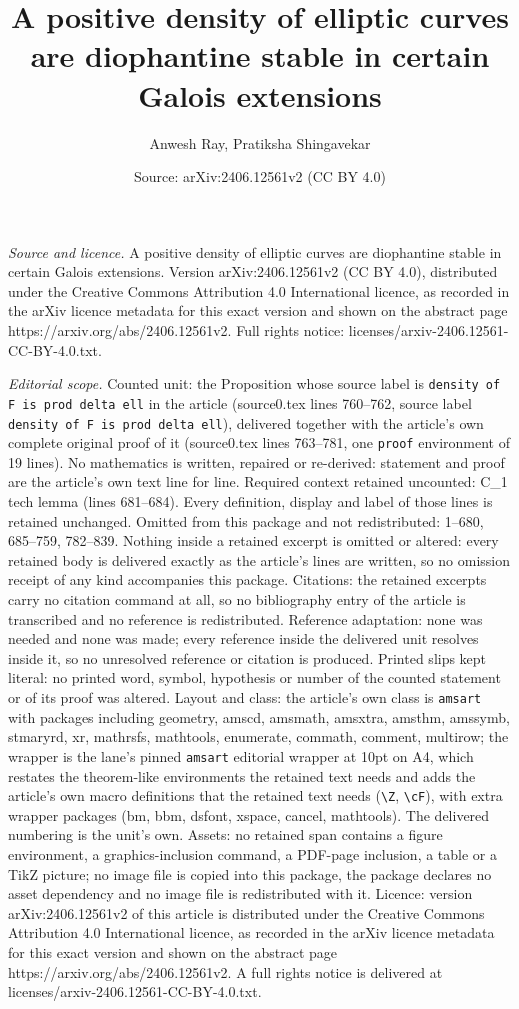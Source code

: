 \documentclass[10pt,a4paper]{amsart}
\title[A positive density of elliptic curves are diophantine stable]{A positive density of elliptic curves are diophantine stable in certain Galois extensions}
\author{Anwesh Ray, Pratiksha Shingavekar}
\date{Source: arXiv:2406.12561v2 (CC BY 4.0)}
\begin{document}
\maketitle

\noindent\emph{Source and licence.} A positive density of elliptic curves are diophantine stable in certain Galois extensions. Version arXiv:2406.12561v2 (CC BY 4.0), distributed under the Creative Commons Attribution 4.0 International licence, as recorded in the arXiv licence metadata for this exact version and shown on the abstract page https://arxiv.org/abs/2406.12561v2. Full rights notice: licenses/arxiv-2406.12561-CC-BY-4.0.txt.\par\smallskip

\noindent\textit{Editorial scope.} Counted unit: the Proposition whose source label is \texttt{density of F is prod delta ell} in the article (source0.tex lines 760--762, source label \texttt{density of F is prod delta ell}), delivered together with the article's own complete original proof of it (source0.tex lines 763--781, one \texttt{proof} environment of 19 lines). No mathematics is written, repaired or re-derived: statement and proof are the article's own text line for line. Required context retained uncounted: C\_1 tech lemma (lines 681--684). Every definition, display and label of those lines is retained unchanged. Omitted from this package and not redistributed: 1--680, 685--759, 782--839. Nothing inside a retained excerpt is omitted or altered: every retained body is delivered exactly as the article's lines are written, so no omission receipt of any kind accompanies this package. Citations: the retained excerpts carry no citation command at all, so no bibliography entry of the article is transcribed and no reference is redistributed. Reference adaptation: none was needed and none was made; every reference inside the delivered unit resolves inside it, so no unresolved reference or citation is produced. Printed slips kept literal: no printed word, symbol, hypothesis or number of the counted statement or of its proof was altered. Layout and class: the article's own class is \texttt{amsart} with packages including geometry, amscd, amsmath, amsxtra, amsthm, amssymb, stmaryrd, xr, mathrsfs, mathtools, enumerate, commath, comment, multirow; the wrapper is the lane's pinned \texttt{amsart} editorial wrapper at 10pt on A4, which restates the theorem-like environments the retained text needs and adds the article's own macro definitions that the retained text needs (\texttt{\textbackslash Z}, \texttt{\textbackslash cF}), with extra wrapper packages (bm, bbm, dsfont, xspace, cancel, mathtools). The delivered numbering is the unit's own. Assets: no retained span contains a figure environment, a graphics-inclusion command, a PDF-page inclusion, a table or a TikZ picture; no image file is copied into this package, the package declares no asset dependency and no image file is redistributed with it. Licence: version arXiv:2406.12561v2 of this article is distributed under the Creative Commons Attribution 4.0 International licence, as recorded in the arXiv licence metadata for this exact version and shown on the abstract page https://arxiv.org/abs/2406.12561v2. A full rights notice is delivered at licenses/arxiv-2406.12561-CC-BY-4.0.txt. 
\end{document}
